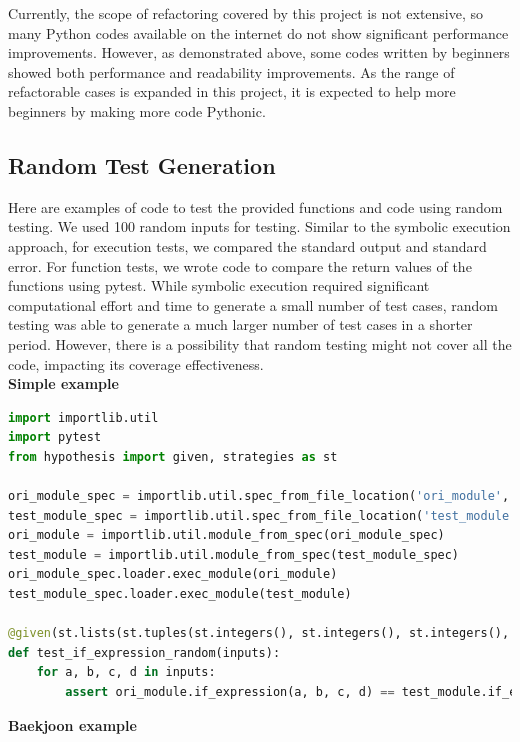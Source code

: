 \documentclass[11pt]{article}
\begin{document}
Currently, the scope of refactoring covered by this project is not extensive, so many Python codes available on the internet do not show significant performance improvements. However, as demonstrated above, some codes written by beginners showed both performance and readability improvements. As the range of refactorable cases is expanded in this project, it is expected to help more beginners by making more code Pythonic.\\

\subsection{Random Test Generation}
Here are examples of code to test the provided functions and code using random testing. We used 100 random inputs for testing. Similar to the symbolic execution approach, for execution tests, we compared the standard output and standard error. For function tests, we wrote code to compare the return values of the functions using pytest. While symbolic execution required significant computational effort and time to generate a small number of test cases, random testing was able to generate a much larger number of test cases in a shorter period. However, there is a possibility that random testing might not cover all the code, impacting its coverage effectiveness.\\

\textbf{Simple example}

\begin{lstlisting}[language=python]
import importlib.util
import pytest
from hypothesis import given, strategies as st

ori_module_spec = importlib.util.spec_from_file_location('ori_module', './examples/simple/diff_example2.py')
test_module_spec = importlib.util.spec_from_file_location('test_module', './updated/simple/diff_example2.py')
ori_module = importlib.util.module_from_spec(ori_module_spec)
test_module = importlib.util.module_from_spec(test_module_spec)
ori_module_spec.loader.exec_module(ori_module)
test_module_spec.loader.exec_module(test_module)

@given(st.lists(st.tuples(st.integers(), st.integers(), st.integers(), st.integers()), min_size=100, max_size=100, unique=True))
def test_if_expression_random(inputs):
    for a, b, c, d in inputs:
        assert ori_module.if_expression(a, b, c, d) == test_module.if_expression(a, b, c, d)
\end{lstlisting}


\textbf{Baekjoon example}
\end{document}
